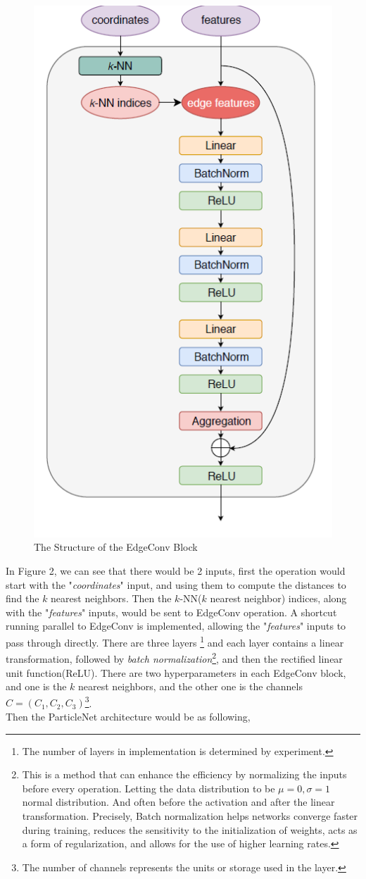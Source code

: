 \documentclass[12pt]{article}
\numberwithin{equation}{section}
\begin{document}
\begin{figure}[H]
    \centering
    \includegraphics[width=0.35\linewidth]{The Structure of the EdgeConv block.png}
    \caption{The Structure of the EdgeConv Block}
    \label{2}
\end{figure}

In Figure 2, we can see that there would be 2 inputs, first the operation would start with the "\textit{coordinates}" input, and using them to compute the distances to find the $k$ nearest neighbors. Then the $k$-NN($k$ nearest neighbor) indices, along with the "\textit{features}" inputs, would be sent to EdgeConv operation. A shortcut running parallel to EdgeConv is implemented, allowing the "\textit{features}" inputs to pass through directly. There are three layers \footnote{The number of layers in implementation is determined by experiment.}
and each layer contains a linear transformation, followed by \textit{batch normalization}\footnote{This is a method that can enhance the efficiency by normalizing the inputs before every operation. Letting the data distribution to be $\mu = 0, \sigma = 1$ normal distribution. And often before the activation and after the linear transformation. Precisely, Batch normalization helps networks converge faster during training, reduces the sensitivity to the initialization of weights, acts as a form of regularization, and allows for the use of higher learning rates.}, and then the rectified linear unit function(ReLU). There are two hyperparameters in each EdgeConv block, and one is the $k$ nearest neighbors, and the other one is the channels $C = (C_1, C_2, C_3)$\footnote{The number of channels represents the units or storage used in the layer.}.\\
\indent Then the ParticleNet architecture would be as following,
\end{document}
